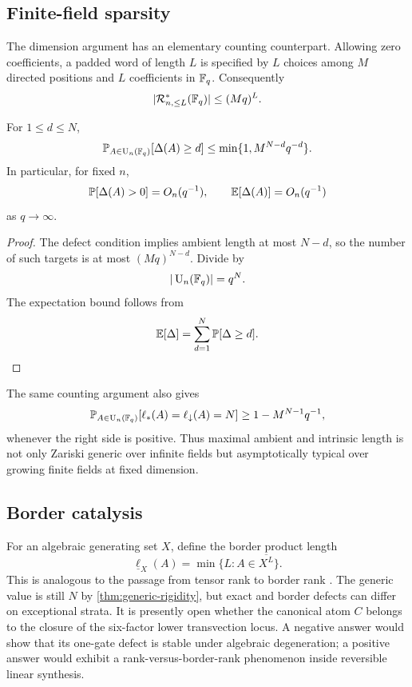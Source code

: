 \subsection{Finite-field sparsity}

The dimension argument has an elementary counting counterpart.  Allowing zero coefficients, a padded word of length $L$ is specified by $L$ choices among $M$ directed positions and $L$ coefficients in $\mathbb F_q$.  Consequently
\[
|\mathcal R^*_{n,\le L}(\mathbb F_q)|\le(Mq)^L.
\]

\begin{corollary}\label{cor:finite-field-density}
For $1\le d\le N$,
\[
\mathbb P_{A\in\operatorname{U}_n(\mathbb F_q)}[\Delta(A)\ge d]
\le
\min\{1,M^{N-d}q^{-d}\}.
\]
In particular, for fixed $n$,
\[
\mathbb P[\Delta(A)>0]=O_n(q^{-1}),
\qquad
\mathbb E[\Delta(A)]=O_n(q^{-1})
\]
as $q\to\infty$.
\end{corollary}

\begin{proof}
The defect condition implies ambient length at most $N-d$, so the number of such targets is at most $(Mq)^{N-d}$.  Divide by
\[
|\operatorname{U}_n(\mathbb F_q)|=q^N.
\]
The expectation bound follows from
\[
\mathbb E[\Delta]=\sum_{d=1}^{N}\mathbb P[\Delta\ge d].
\]
\end{proof}

The same counting argument also gives
\[
\mathbb P_{A\in\operatorname{U}_n(\mathbb F_q)}[\ell_{*}(A)=\ell_{\downarrow}(A)=N]
\ge
1-M^{N-1}q^{-1},
\]
whenever the right side is positive.  Thus maximal ambient and intrinsic length is not only Zariski generic over infinite fields but asymptotically typical over growing finite fields at fixed dimension.

\subsection{Border catalysis}

For an algebraic generating set $X$, define the border product length
\[
\underline\ell_X(A)
=
\min\{L:A\in\overline{X^L}\}.
\]
This is analogous to the passage from tensor rank to border rank \cite{Landsberg2012}.  The generic value is still $N$ by \cref{thm:generic-rigidity}, but exact and border defects can differ on exceptional strata.  It is presently open whether the canonical atom $C$ belongs to the closure of the six-factor lower transvection locus.  A negative answer would show that its one-gate defect is stable under algebraic degeneration; a positive answer would exhibit a rank-versus-border-rank phenomenon inside reversible linear synthesis.

